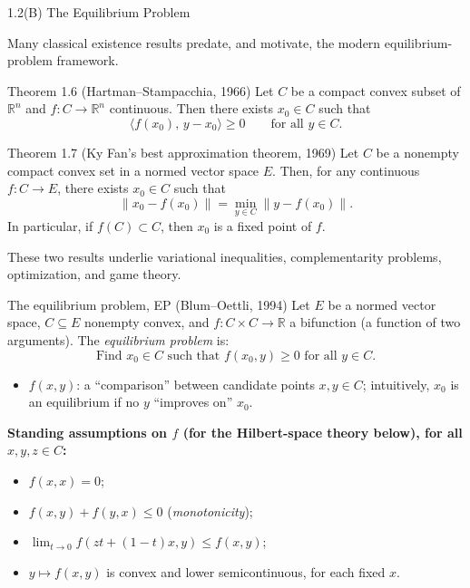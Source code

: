 \documentclass[aspectratio=169,10pt]{beamer}
\newcommand{\R}{\mathbb{R}}
\begin{document}
\begin{frame}[allowframebreaks]{1.2(B) The Equilibrium Problem}

Many classical existence results predate, and motivate, the modern
equilibrium-problem framework.

\begin{block}{Theorem 1.6 (Hartman--Stampacchia, 1966)}
Let $C$ be a compact convex subset of $\R^n$ and $f:C\to\R^n$ continuous.
Then there exists $x_0\in C$ such that
\[
  \langle f(x_0),\,y-x_0\rangle \ge 0 \qquad \text{for all } y\in C.
\]
\end{block}

\begin{block}{Theorem 1.7 (Ky Fan's best approximation theorem, 1969)}
Let $C$ be a nonempty compact convex set in a normed vector space $E$.
Then, for any continuous $f:C\to E$, there exists $x_0\in C$ such that
\[
  \|x_0-f(x_0)\| = \min_{y\in C}\|y-f(x_0)\|.
\]
In particular, if $f(C)\subset C$, then $x_0$ is a fixed point of $f$.
\end{block}

These two results underlie variational inequalities, complementarity
problems, optimization, and game theory.

\framebreak

\begin{block}{The equilibrium problem, EP (Blum--Oettli, 1994)}
Let $E$ be a normed vector space, $C\subseteq E$ nonempty convex, and
$f:C\times C\to\R$ a bifunction (a function of two arguments). The
\emph{equilibrium problem} is:
\[
  \text{Find } x_0\in C \text{ such that } f(x_0,y)\ge 0 \text{ for all } y\in C.
\]
\begin{itemize}
  \item $f(x,y)$: a ``comparison'' between candidate points $x,y\in C$;
    intuitively, $x_0$ is an equilibrium if no $y$ ``improves on'' $x_0$.
\end{itemize}
\end{block}

\textbf{Standing assumptions on $f$ (for the Hilbert-space theory below),
for all $x,y,z\in C$:}
\begin{itemize}
  \item[(a1)] $f(x,x)=0$;
  \item[(a2)] $f(x,y)+f(y,x)\le 0$ (\emph{monotonicity});
  \item[(a3)] $\displaystyle\lim_{t\to0}f(zt+(1-t)x,y)\le f(x,y)$;
  \item[(a4)] $y\mapsto f(x,y)$ is convex and lower semicontinuous, for
    each fixed $x$.
\end{itemize}


\end{frame}
\end{document}
